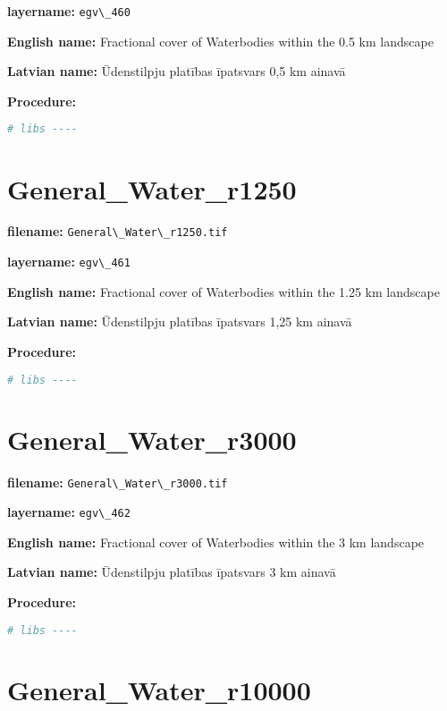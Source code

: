 \documentclass[
]{book}
\newcommand{\passthrough}[1]{#1}
\begin{document}
\textbf{layername:} \passthrough{\lstinline!egv\_460!}

\textbf{English name:} Fractional cover of Waterbodies within the 0.5 km landscape

\textbf{Latvian name:} Ūdenstilpju platības īpatsvars 0,5 km ainavā

\textbf{Procedure:}

\begin{lstlisting}[language=R]
# libs ----
\end{lstlisting}

\section{General\_Water\_r1250}\label{ch06.461}

\textbf{filename:} \passthrough{\lstinline!General\_Water\_r1250.tif!}

\textbf{layername:} \passthrough{\lstinline!egv\_461!}

\textbf{English name:} Fractional cover of Waterbodies within the 1.25 km landscape

\textbf{Latvian name:} Ūdenstilpju platības īpatsvars 1,25 km ainavā

\textbf{Procedure:}

\begin{lstlisting}[language=R]
# libs ----
\end{lstlisting}

\section{General\_Water\_r3000}\label{ch06.462}

\textbf{filename:} \passthrough{\lstinline!General\_Water\_r3000.tif!}

\textbf{layername:} \passthrough{\lstinline!egv\_462!}

\textbf{English name:} Fractional cover of Waterbodies within the 3 km landscape

\textbf{Latvian name:} Ūdenstilpju platības īpatsvars 3 km ainavā

\textbf{Procedure:}

\begin{lstlisting}[language=R]
# libs ----
\end{lstlisting}

\section{General\_Water\_r10000}\label{ch06.463}
\end{document}
